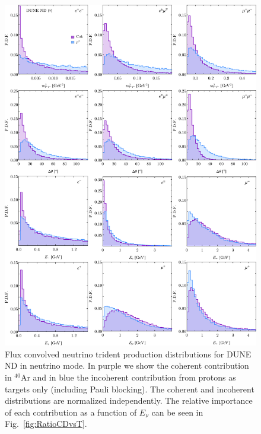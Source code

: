 \begin{figure}[H]
\centering
\includegraphics[width=\textwidth]{figs/DUNE_nu_3horn_mll_theta_E.pdf}
\caption[Neutrino trident distributions at the DUNE ND.]{Flux convolved neutrino trident production distributions for DUNE ND in neutrino mode. In purple we show the coherent contribution in $^{40}$Ar and in blue the incoherent contribution from protons as targets only (including Pauli blocking). The coherent and incoherent distributions are normalized independently. The relative importance of each contribution as a function of $E_\nu$
can be seen in Fig.~\ref{fig:RatioCDvsT}.
%
\label{fig:DUNE_ND_dist}}
\end{figure}
%
